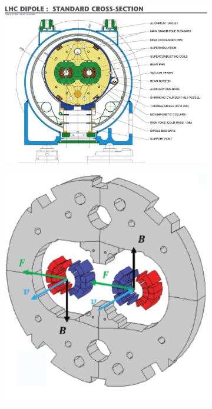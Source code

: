 \begin{figure}[ht]
    \centering
    \begin{subfigure}[b]{0.65\textwidth}
      \centering
      \includegraphics[width=1.0\textwidth]{figs/detector/dipolecrosssection.png}
      \caption{}
      \label{fig:detector:dipolecrossxsec}
    \end{subfigure}
    \hfill
    \begin{subfigure}[b]{0.34\textwidth}
      \centering
      \includegraphics[width=1.0\textwidth]{figs/detector/dipole.png}

\end{subfigure}
\end{figure}

